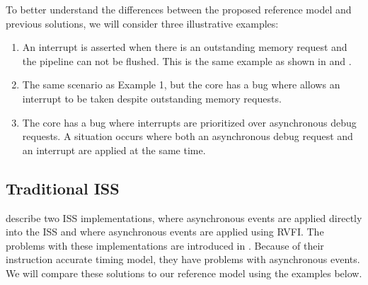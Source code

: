 To better understand the differences between the proposed reference model and previous solutions, we will consider three illustrative examples:

\begin{enumerate}[label=\textbf{Example \arabic*}]
    \item An interrupt is asserted when there is an outstanding memory request and the pipeline can not be flushed. This is the same example as shown in  and .
    \item The same scenario as Example 1, but the core has a bug where  allows an interrupt to be taken despite outstanding memory requests.
    \item The core has a bug where interrupts are prioritized over asynchronous debug requests. A situation occurs where both an asynchronous debug request and an interrupt are applied at the same time. 
\end{enumerate}

%


\subsection{Traditional ISS}

\textcite{taylorAdvancedRISCVVerification2023} describe two ISS implementations, where asynchronous events are applied directly into the ISS and where asynchronous events are applied using RVFI. The problems with these implementations are introduced in .
Because of their instruction accurate timing model, they have problems with asynchronous events. We will compare these solutions to our reference model using the examples below.


